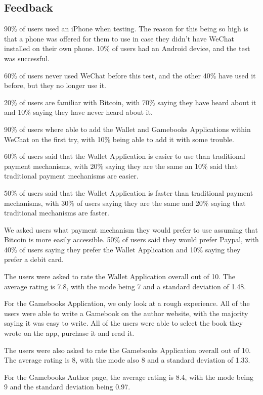 \subsection{Feedback}

90\% of users used an iPhone when testing. The reason for this being so high is that a phone was offered for them to use in case they didn't have WeChat installed on their own phone. 10\% of users had an Android device, and the test was successful.

60\% of users never used WeChat before this test, and the other 40\% have used it before, but they no longer use it.

20\% of users are familiar with Bitcoin, with 70\% saying they have heard about it and 10\% saying they have never heard about it. 

90\% of users where able to add the Wallet and Gamebooks Applications within WeChat on the first try, with 10\% being able to add it with some trouble.

60\% of users said that the Wallet Application is easier to use than traditional payment mechanisms, with 20\% saying they are the same an 10\% said that traditional payment mechanisms are easier.

50\% of users said that the Wallet Application is faster than traditional payment mechanisms, with 30\% of users saying they are the same and 20\% saying that traditional mechanisms are faster.

We asked users what payment mechanism they would prefer to use assuming that Bitcoin is more easily accessible. 50\% of users said they would prefer Paypal, with 40\% of users saying they prefer the Wallet Application and 10\% saying they prefer a debit card.

The users were asked to rate the Wallet Application overall out of 10. The average rating is 7.8, with the mode being 7 and a standard deviation of 1.48.

For the Gamebooks Application, we only look at a rough experience. All of the users were able to write a Gamebook on the author website, with the majority saying it was easy to write. All of the users were able to select the book they wrote on the app, purchase it and read it.

The users were also asked to rate the Gamebooks Application overall out of 10. The average rating is 8, with the mode also 8 and a standard deviation of 1.33.

For the Gamebooks Author page, the average rating is 8.4, with the mode being 9 and the standard deviation being 0.97.


